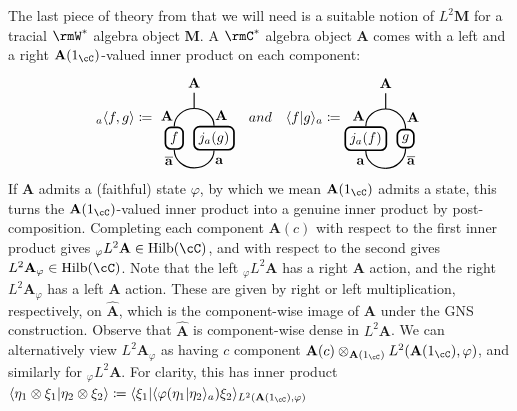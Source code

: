 \documentclass[11pt,reqno]{amsart}
\DeclareMathOperator{\Hilb}{Hilb}
\newcommand{\bb}[1]{\mathbf{#1}}
\newcommand{\bbover}[1]{\mathbf{\overline{#1}}}
\numberwithin{equation}{section}
\theoremstyle{plain}
\begin{document}
The last piece of theory from \cite{JP17} that we will need is a suitable notion of $L^2 \bb M$ for a tracial $\rmW^*$ algebra object $\bb M$.
A $\rmC^*$ algebra object $\bb A$ comes with a left and a right $\bb A(1_{\cC})$-valued inner product on each component:
\[{}_a\langle f , g \rangle \coloneq
\begin{tikzpicture}[baseline={(current bounding box.center)},thick]
\draw (0, 0) node[draw=black,fill=white,very thick,rounded corners,baseline=center] (a){$f$};
\draw ([xshift=1cm]a) node[draw=black,fill=white,very thick,rounded corners,baseline=center] (b){$j_a(g)$};
\filldraw ([xshift=0.5cm, yshift=0.75cm]a) circle (0pt) coordinate (c);
\filldraw ([xshift=0.5cm, yshift=-0.75cm]a) circle (0pt) coordinate (d);
\draw (a.north) to [out=90, in=180] node[pos=0.4, left] {$\bb A$} (c);
\draw (b.north) to [out=90, in=0] node[pos=0.4, right] {$\bb A$} (c);
\draw (a.south) to [out=-90, in=180] node[pos=0.4, left] {$\bbover a$} (d);
\draw (b.south) to [out=-90, in=0] node[pos=0.4, right] {$\bb a$} (d);
\draw (c) --node[pos=1, above] {$\bb A$}++ (0, 0.4);
\end{tikzpicture}
\quad and \quad
\langle f | g \rangle_a \coloneq
\begin{tikzpicture}[baseline={(current bounding box.center)},thick]
\draw (0, 0) node[draw=black,fill=white,very thick,rounded corners,baseline=center] (a){$j_a(f)$};
\draw ([xshift=1cm]a) node[draw=black,fill=white,very thick,rounded corners,baseline=center] (b){$g$};
\filldraw ([xshift=0.5cm, yshift=0.75cm]a) circle (0pt) coordinate (c);
\filldraw ([xshift=0.5cm, yshift=-0.75cm]a) circle (0pt) coordinate (d);
\draw (a.north) to [out=90, in=180] node[pos=0.4, left] {$\bb A$} (c);
\draw (b.north) to [out=90, in=0] node[pos=0.4, right] {$\bb A$} (c);
\draw (a.south) to [out=-90, in=180] node[pos=0.4, left] {$\bb a$} (d);
\draw (b.south) to [out=-90, in=0] node[pos=0.4, right] {$\bbover a$} (d);
\draw (c) --node[pos=1, above] {$\bb A$}++ (0, 0.4);
\end{tikzpicture}
\]
If $\bb A$ admits a (faithful) state $\varphi$, by which we mean $\bb A(1_{\cC})$ admits a state, this turns the $\bb A(1_{\cC})$-valued inner product into a genuine inner product by post-composition.
Completing each component $\bb A(c)$ with respect to the first inner product gives ${}_\varphi L^2\bb A \in \Hilb(\cC)$, and with respect to the second gives $L^2\bb A_\varphi \in \Hilb(\cC)$.
Note that the left ${}_\varphi L^2 \bb A$ has a right $\bb A$ action, and the right $L^2 \bb A_\varphi$ has a left $\bb A$ action.
These are given by right or left multiplication, respectively, on $\widehat{\bb A}$, which is the component-wise image of $\bb A$ under the GNS construction.
Observe that $\widehat{\bb A}$ is component-wise dense in $L^2\bb A$.
We can alternatively view $L^2\bb A_\varphi$ as having $c$ component $\bb A(c) \otimes_{\bb A(1_{\cC})} L^2(\bb A(1_{\cC}), \varphi)$, and similarly for ${}_\varphi L^2 \bb A$.
For clarity, this has inner product $\langle \eta_1 \otimes \xi_1 | \eta_2 \otimes \xi_2 \rangle \coloneq \langle \xi_1 | \langle \varphi(\eta_1 | \eta_2 \rangle_a) \xi_2 \rangle_{L^2(\bb A(1_{\cC}), \varphi)}$
\end{document}
